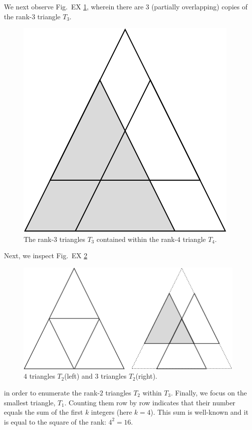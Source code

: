 \begin{itemize}
\begin{enumerate}
We next observe Fig.~EX \ref{fig:countingTriangles3}, wherein there are $3$ (partially overlapping) copies of the rank-$3$ triangle $T_3$.
\begin{figure}[h]
\begin{center}
        \includegraphics[scale=0.25]{FiguresArithmetic/CountingTriangles3} 
        \caption{The rank-$3$ triangles $T_3$ contained within the rank-$4$ triangle $T_4$.}
        \label{fig:countingTriangles3}
\end{center}
\end{figure}
Next, we inspect Fig.~EX \ref{fig:countingTriangles2}
\begin{figure}[h]
\begin{center}
        \includegraphics[scale=0.25]{FiguresArithmetic/CountingTriangles2} 
        \caption{$4$ triangles $T_2$(left) and $3$ triangles $T_2$(right).}
        \label{fig:countingTriangles2}
\end{center}
\end{figure}
in order to enumerate the rank-$2$ triangles $T_2$ within $T_3$.  Finally, we focus on the smallest triangle, $T_1$.  Counting them row by row indicates that their number equals the sum of the first $k$ integers (here $k=4$).
This sum is well-known and it is equal to the square of the rank: $4^2 = 16$.


\end{enumerate}
\end{itemize}
